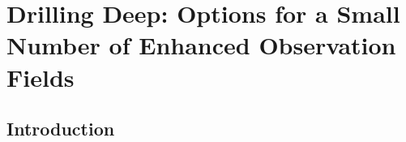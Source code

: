 \chapter[Deep Drilling Fields]{Drilling Deep: Options for a Small Number of Enhanced Observation
Fields}
\def\chpname{deepdrilling}\label{chp:\chpname}



\section{Introduction}
\label{sec:\chpname:intro}



% 


% 

